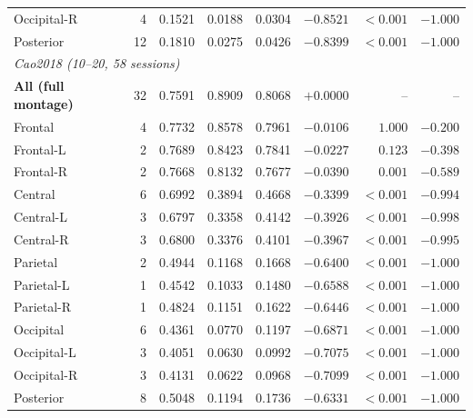 \begin{table}[htbp]
\begin{tabular}{lrrrrrrr}
Occipital-R & 4 & 0.1521 & 0.0188 & 0.0304 & $-0.8521$ & $<0.001$ & $-1.000$ \\
Posterior & 12 & 0.1810 & 0.0275 & 0.0426 & $-0.8399$ & $<0.001$ & $-1.000$ \\
\midrule
\multicolumn{8}{l}{\textit{Cao2018 (10--20, 58 sessions)}} \\[2pt]
\textbf{All (full montage)} & 32 & 0.7591 & 0.8909 & 0.8068 & $+0.0000$ & -- & -- \\
Frontal & 4 & 0.7732 & 0.8578 & 0.7961 & $-0.0106$ & $1.000$ & $-0.200$ \\
Frontal-L & 2 & 0.7689 & 0.8423 & 0.7841 & $-0.0227$ & $0.123$ & $-0.398$ \\
Frontal-R & 2 & 0.7668 & 0.8132 & 0.7677 & $-0.0390$ & $0.001$ & $-0.589$ \\
Central & 6 & 0.6992 & 0.3894 & 0.4668 & $-0.3399$ & $<0.001$ & $-0.994$ \\
Central-L & 3 & 0.6797 & 0.3358 & 0.4142 & $-0.3926$ & $<0.001$ & $-0.998$ \\
Central-R & 3 & 0.6800 & 0.3376 & 0.4101 & $-0.3967$ & $<0.001$ & $-0.995$ \\
Parietal & 2 & 0.4944 & 0.1168 & 0.1668 & $-0.6400$ & $<0.001$ & $-1.000$ \\
Parietal-L & 1 & 0.4542 & 0.1033 & 0.1480 & $-0.6588$ & $<0.001$ & $-1.000$ \\
Parietal-R & 1 & 0.4824 & 0.1151 & 0.1622 & $-0.6446$ & $<0.001$ & $-1.000$ \\
Occipital & 6 & 0.4361 & 0.0770 & 0.1197 & $-0.6871$ & $<0.001$ & $-1.000$ \\
Occipital-L & 3 & 0.4051 & 0.0630 & 0.0992 & $-0.7075$ & $<0.001$ & $-1.000$ \\
Occipital-R & 3 & 0.4131 & 0.0622 & 0.0968 & $-0.7099$ & $<0.001$ & $-1.000$ \\
Posterior & 8 & 0.5048 & 0.1194 & 0.1736 & $-0.6331$ & $<0.001$ & $-1.000$ \\
\bottomrule
\end{tabular}
\end{table}
